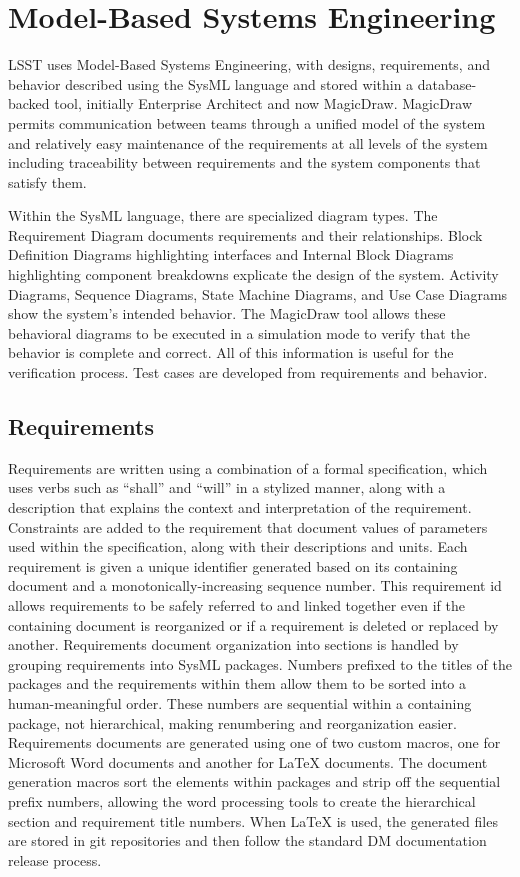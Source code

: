 \section{Model-Based Systems Engineering}

LSST uses Model-Based Systems Engineering\cite{2014SPIE.9150E..0MC}, with designs, requirements, and behavior described using the SysML language and stored within a database-backed tool, initially Enterprise Architect and now MagicDraw.
MagicDraw permits communication between teams through a unified model of the system and
relatively easy maintenance of the requirements at all levels of the system including traceability between requirements and the system components that satisfy them.

\noindent Within the SysML language, there are specialized diagram types.
The Requirement Diagram documents requirements and their relationships.
Block Definition Diagrams highlighting interfaces and Internal Block Diagrams highlighting component breakdowns explicate the design of the system.
Activity Diagrams, Sequence Diagrams, State Machine Diagrams, and Use Case Diagrams show the system's intended behavior.
The MagicDraw tool allows these behavioral diagrams to be executed in a simulation mode to verify that the behavior is complete and correct.
All of this information is useful for the verification process.
Test cases are developed from requirements and behavior.

\subsection{Requirements}

Requirements are written using a combination of a formal specification, which uses verbs such as ``shall'' and ``will'' in a stylized manner, along with a description that explains the context and interpretation of the requirement.
Constraints are added to the requirement that document values of parameters used within the specification, along with their descriptions and units.
Each requirement is given a unique identifier generated based on its containing document and a monotonically-increasing sequence number.
This requirement id allows requirements to be safely referred to and linked together even if the containing document is reorganized or if a requirement is deleted or replaced by another.
Requirements document organization into sections is handled by grouping requirements into SysML packages.
Numbers prefixed to the titles of the packages and the requirements within them allow them to be sorted into a human-meaningful order.
These numbers are sequential within a containing package, not hierarchical, making renumbering and reorganization easier.
Requirements documents are generated using one of two custom macros, one for Microsoft Word documents and another for LaTeX documents.
The document generation macros sort the elements within packages and strip off the sequential prefix numbers, allowing the word processing tools to create the hierarchical section and requirement title numbers.
When LaTeX is used, the generated files are stored in git repositories and then follow the standard DM documentation release process.

